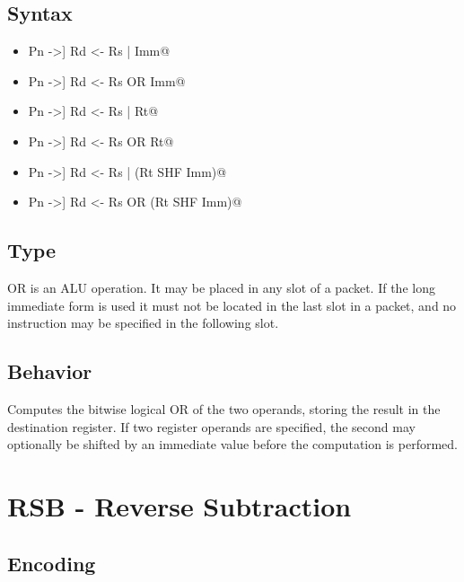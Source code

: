\documentclass[11pt,openany]{report}
\begin{document}
\subsection{Syntax}

\begin{itemize}
  \item \verb@[[!]Pn ->] Rd <- Rs | Imm@
  \item \verb@[[!]Pn ->] Rd <- Rs OR Imm@
  \item \verb@[[!]Pn ->] Rd <- Rs | Rt@
  \item \verb@[[!]Pn ->] Rd <- Rs OR Rt@
  \item \verb@[[!]Pn ->] Rd <- Rs | (Rt SHF Imm)@
  \item \verb@[[!]Pn ->] Rd <- Rs OR (Rt SHF Imm)@
\end{itemize}

\subsection{Type}
OR is an ALU operation. It may be placed in any slot of a packet. If the long immediate form is used it must not be located in the last slot in a packet, and no instruction may be specified in the following slot.

\subsection{Behavior}
Computes the bitwise logical OR of the two operands, storing the result in the destination register. If two register operands are specified, the second may optionally be shifted by an immediate value before the computation is performed.


\pagebreak
\section{RSB - Reverse Subtraction}
\label{sec:rsbinst}

\subsection{Encoding}
\end{document}
